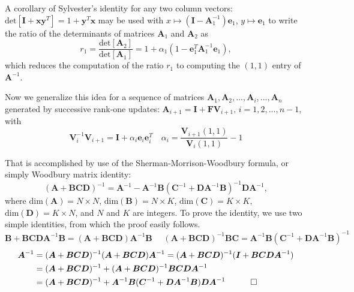 A corollary of Sylvester's identity for any two column vectors: $\text{det}[\bm I + \bm x \bm y^T] = 1 + \bm y^T \bm x$ may be used with $x \mapsto ( \bm I - \bm A_1^{-1} ) \bm e_1$, $y \mapsto \bm e_1$ to write the ratio of the determinants of matrices $\bm A_1$ and $\bm A_2$ as
\begin{equation}\label{eq:efRatio}
r_1 = \frac{\text{det}[\bm A_2]}{\text{det}[\bm A_1]} = 1 + \alpha_1 ( 1 - \bm e_1^T \bm A_1^{-1} \bm e_1 ) ,
\end{equation}
which reduces the computation of the ratio $r_1$ to computing the $(1,1)$ entry of $\bm A^{-1}$.

Now we generalize this idea for a sequence of matrices $\bm A_1, \bm A_2, ..., \bm A_i, ..., \bm A_n$ generated by successive rank-one updates: $\bm A_{i+1} = \bm I + \bm F \bm V_{i+1}, \, i = 1, 2, ..., n-1$, with
\begin{equation}
\bm V_i^{-1} \bm V_{i+1} = \bm I + \alpha_i \bm e_i \bm e_i^T \quad \alpha_i = \frac{\bm V_{i+1}(1,1)}{\bm V_i (1,1)} -1
\end{equation}

That is accomplished by use of the  Sherman-Morrison-Woodbury formula, or simply Woodbury matrix identity:
\begin{equation}
( \bm A + \bm B \bm C \bm D )^{-1} = \bm A^{-1} - \bm A^{-1} \bm B ( \bm C^{-1} + \bm D \bm A^{-1} \bm B )^{-1} \bm D \bm A^{-1} ,
\end{equation}
where $\text{dim}(\bm A) = N \times N $, $\text{dim}(\bm B) = N \times K $, $\text{dim}(\bm C) = K \times K $, $\text{dim}(\bm D) = K \times N $, and $N$ and $K$ are integers.
To prove the identity, we use two simple identities, from which the proof easily follows.
\begin{equation}
\bm B + \bm B \bm C \bm D \bm A^{-1} \bm B = ( \bm A + \bm B \bm C \bm D ) \bm A^{-1} \bm B
\quad\,\,
( \bm A + \bm B \bm C \bm D )^{-1} \bm B \bm C = \bm A^{-1} \bm B ( \bm C^{-1} + \bm D \bm A^{-1} \bm B )^{-1}
\end{equation}
\begin{equation}
\begin{split}
\bm A^{-1} &= ( \bm A + \bm B \bm C \bm D )^{-1} ( \bm A + \bm B \bm C \bm D ) \bm A^{-1} = ( \bm A + \bm B \bm C \bm D )^{-1} ( \bm I + \bm B \bm C \bm D \bm A^{-1} ) \\
&= ( \bm A + \bm B \bm C \bm D )^{-1} + ( \bm A + \bm B \bm C \bm D )^{-1} \bm B \bm C \bm D \bm A^{-1} \\
&= ( \bm A + \bm B \bm C \bm D )^{-1} + \bm A^{-1} \bm B ( \bm C^{-1} + \bm D \bm A^{-1} \bm B ) \bm D \bm A^{-1}
\quad
\qed
\end{split}
\end{equation}

